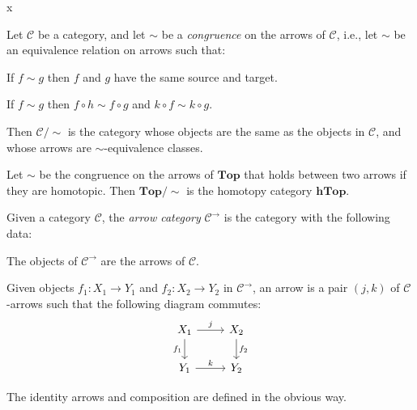 \documentclass[article, a4paper, 11pt, oneside]{memoir}
\numberwithin{equation}{chapter}
\newcommand{\cat}[1]{\mathcal{#1}}
\newcommand{\ncat}[1]{\mathbf{#1}} %
\newcommand{\catTop}{\ncat{Top}}
\newcommand{\cathTop}{\ncat{hTop}}
\newcommand{\catC}{\cat{C}}
\theoremstyle{myexample}
\theoremstyle{myexamplebreak}
\begin{document}
\begin{definition}
    x
\end{definition}


\begin{definition}
    Let $\catC$ be a category, and let $\sim$ be a \emph{congruence} on the arrows of $\catC$, i.e., let $\sim$ be an equivalence relation on arrows such that:
    \begin{enumdef}
        \item If $f \sim g$ then $f$ and $g$ have the same source and target.
        
        \item If $f \sim g$ then $f \circ h \sim f \circ g$ and $k \circ f \sim k \circ g$.
    \end{enumdef}
    Then $\catC/{\sim}$ is the category whose objects are the same as the objects in $\catC$, and whose arrows are $\sim$-equivalence classes.
\end{definition}


\begin{example}
    Let $\sim$ be the congruence on the arrows of $\catTop$ that holds between two arrows if they are homotopic. Then $\catTop/{\sim}$ is the homotopy category $\cathTop$.
\end{example}


\begin{definition}
    Given a category $\catC$, the \emph{arrow category} $\catC^\to$ is the category with the following data:
    \begin{enumdef}
        \item The objects of $\catC^\to$ are the arrows of $\catC$.
        
        \item Given objects $f_1 \colon X_1 \to Y_1$ and $f_2 \colon X_2 \to Y_2$ in $\catC^\to$, an arrow is a pair $(j,k)$ of $\catC$-arrows such that the following diagram commutes:
        \begin{equation*}
            \begin{tikzcd}
                X_1
                    \ar[r, "j"]
                    \ar[d, "f_1", swap]
                & X_2
                    \ar[d, "f_2"]
                \\
                Y_1
                    \ar[r, "k"]
                & Y_2
            \end{tikzcd}
        \end{equation*}
    \end{enumdef}
    The identity arrows and composition are defined in the obvious way.
\end{definition}
\end{document}
